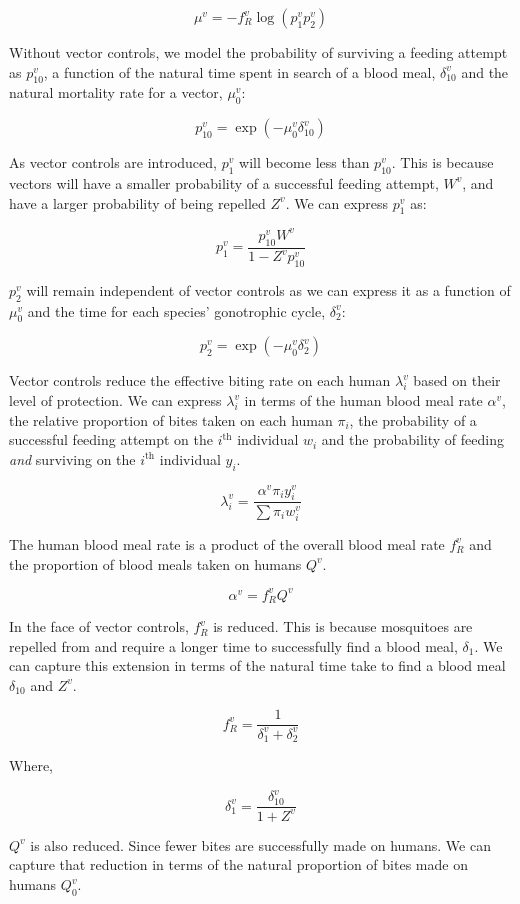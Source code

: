\documentclass{bmcart}
\begin{document}
\[
\mu^v = -f_R^v \log(p_1^vp_2^v)
\]

Without vector controls, we model the probability of surviving a feeding attempt as $p_{10}^v$, a function of the natural time spent in search of a blood meal, $\delta_{10}^v$ and the natural mortality rate for a vector, $\mu_0^v$:

\[
p_{10}^v = \exp(-\mu_0^v\delta^v_{10})
\]

As vector controls are introduced, $p_1^v$ will become less than $p_{10}^v$. This is because vectors will have a smaller probability of a successful feeding attempt, $W^v$, and have a larger probability of being repelled $Z^v$. We can express $p_1^v$ as:

\[
p_1^v = \frac{p_{10}^vW^v}{1 - Z^vp^v_{10}}
\]

$p_2^v$ will remain independent of vector controls as we can express it as a function of $\mu_0^v$ and the time for each species' gonotrophic cycle, $\delta_2^v$:

\[
p_2^v = \exp(-\mu_0^v\delta^v_2)
\]

Vector controls reduce the effective biting rate on each human $\lambda_i^v$ based on their level of protection. We can express $\lambda_i^v$ in terms of the human blood meal rate $\alpha^v$, the relative proportion of bites taken on each human $\pi_i$, the probability of a successful feeding attempt on the $i^{\text{th}}$ individual $w_i$ and the probability of feeding \emph{and} surviving on the $i^{\text{th}}$ individual $y_i$.

\[
\lambda_i^v = \frac{\alpha^v\pi_i y_i^v}{\sum\pi_i w_i^v}
\]

The human blood meal rate is a product of the overall blood meal rate $f_R^v$ and the proportion of blood meals taken on humans $Q^v$.

\[
\alpha^v = f_R^v Q^v
\]

In the face of vector controls, $f_R^v$ is reduced. This is because mosquitoes are repelled from and require a longer time to successfully find a blood meal, $\delta_1$. We can capture this extension in terms of the natural time take to find a blood meal $\delta_{10}$ and $Z^v$.

\[
f_R^v = \frac{1}{\delta^v_1 + \delta^v_2}
\]

Where,

\[
\delta^v_1 = \frac{\delta^v_10}{1 + Z^v}
\]

$Q^v$ is also reduced. Since fewer bites are successfully made on humans. We can capture that reduction in terms of the natural proportion of bites made on humans $Q^v_0$.
\end{document}
